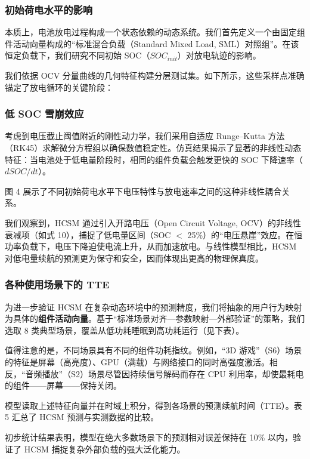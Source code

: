 \documentclass[11pt,a4paper]{ctexart}
\begin{document}
\subsubsection{初始荷电水平的影响}

本质上，电池放电过程构成一个状态依赖的动态系统。我们首先定义一个由固定组件活动向量构成的“标准混合负载（Standard Mixed Load, SML）对照组”。在该恒定负载下，我们研究不同初始 SOC（$SOC_{init}$）对放电轨迹的影响。

我们依据 OCV 分量曲线的几何特征构建分层测试集。如下所示，这些采样点准确锚定了放电循环的关键阶段：

\subsubsection{低 SOC 雪崩效应}

考虑到电压截止阈值附近的刚性动力学，我们采用自适应 Runge--Kutta 方法（RK45）求解微分方程组以确保数值稳定性。仿真结果揭示了显著的非线性动态特征：当电池处于低电量阶段时，相同的组件负载会触发更快的 SOC 下降速率（$dSOC/dt$）。

图 4 展示了不同初始荷电水平下电压特性与放电速率之间的这种非线性耦合关系。

我们观察到，HCSM 通过引入开路电压（Open Circuit Voltage, OCV）的非线性衰减项（如式 10），捕捉了低电量区间（SOC $<$ 25\%）的“电压悬崖”效应。在恒功率负载下，电压下降迫使电流上升，从而加速放电。与线性模型相比，HCSM 对低电量续航的预测更为保守和安全，因而体现出更高的物理保真度。

\subsubsection{各种使用场景下的 TTE}

为进一步验证 HCSM 在复杂动态环境中的预测精度，我们将抽象的用户行为映射为具体的\textbf{组件活动向量}。基于“标准场景对齐—参数映射—外部验证”的策略，我们选取 8 类典型场景，覆盖从低功耗睡眠到高功耗运行（见下表）。

值得注意的是，不同场景具有不同的组件功耗指纹。例如，“3D 游戏”（S6）场景的特征是屏幕（高亮度）、GPU（满载）与网络接口的同时高强度激活。相反，“音频播放”（S2）场景尽管因持续信号解码而存在 CPU 利用率，却使最耗电的组件——屏幕——保持关闭。

模型读取上述特征向量并在时域上积分，得到各场景的预测续航时间（TTE）。表 5 汇总了 HCSM 预测与实测数据的比较。

初步统计结果表明，模型在绝大多数场景下的预测相对误差保持在 10\% 以内，验证了 HCSM 捕捉复杂外部负载的强大泛化能力。
\end{document}
